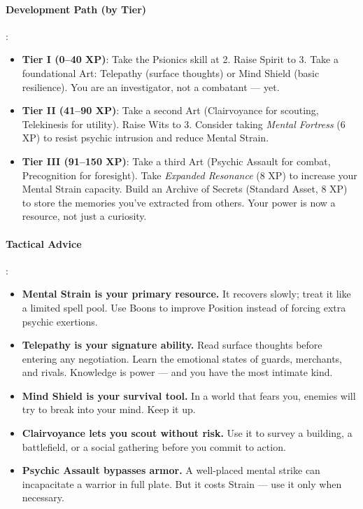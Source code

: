 \paragraph{Development Path (by Tier)}:
\begin{itemize}
\item \textbf{Tier I (0--40 XP)}: Take the Psionics skill at 2. Raise Spirit to 3. Take a foundational Art: Telepathy (surface thoughts) or Mind Shield (basic resilience). You are an investigator, not a combatant --- yet.
\item \textbf{Tier II (41--90 XP)}: Take a second Art (Clairvoyance for scouting, Telekinesis for utility). Raise Wits to 3. Consider taking \emph{Mental Fortress} (6 XP) to resist psychic intrusion and reduce Mental Strain.
\item \textbf{Tier III (91--150 XP)}: Take a third Art (Psychic Assault for combat, Precognition for foresight). Take \emph{Expanded Resonance} (8 XP) to increase your Mental Strain capacity. Build an Archive of Secrets (Standard Asset, 8 XP) to store the memories you've extracted from others. Your power is now a resource, not just a curiosity.
\end{itemize}

\paragraph{Tactical Advice}:
\begin{itemize}
\item \textbf{Mental Strain is your primary resource.} It recovers slowly; treat it like a limited spell pool. Use Boons to improve Position instead of forcing extra psychic exertions.
\item \textbf{Telepathy is your signature ability.} Read surface thoughts before entering any negotiation. Learn the emotional states of guards, merchants, and rivals. Knowledge is power --- and you have the most intimate kind.
\item \textbf{Mind Shield is your survival tool.} In a world that fears you, enemies will try to break into your mind. Keep it up.
\item \textbf{Clairvoyance lets you scout without risk.} Use it to survey a building, a battlefield, or a social gathering before you commit to action.
\item \textbf{Psychic Assault bypasses armor.} A well-placed mental strike can incapacitate a warrior in full plate. But it costs Strain --- use it only when necessary.
\end{itemize}

